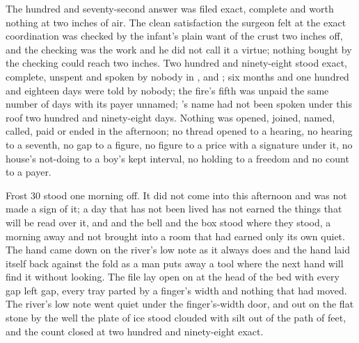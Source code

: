 The hundred and seventy-second answer was filed exact, complete and worth nothing at two inches of air. The clean satisfaction the surgeon felt at the exact coordination was checked by the infant's plain want of the crust two inches off, and the checking was the work and he did not call it a virtue; nothing bought by the checking could reach two inches. Two hundred and ninety-eight stood exact, complete, unspent and spoken by nobody in ,  and ; six months and one hundred and eighteen days were told by nobody; the fire's fifth was unpaid the same number of days with its payer unnamed; 's name had not been spoken under this roof two hundred and ninety-eight days. Nothing was opened, joined, named, called, paid or ended in the afternoon; no thread opened to a hearing, no hearing to a seventh, no gap to a figure, no figure to a price with a signature under it, no house's not-doing to a boy's kept interval, no holding to a freedom and no count to a payer.

Frost 30 stood one morning off. It did not come into this afternoon and was not made a sign of it; a day that has not been lived has not earned the things that will be read over it, and  and the bell and the box stood where they stood, a morning away and not brought into a room that had earned only its own quiet. The hand came down on the river's low note as it always does and the hand laid itself back against the fold as a man puts away a tool where the next hand will find it without looking. The file lay open on  at the head of the bed with every gap left gap, every tray parted by a finger's width and nothing that had moved. The river's low note went quiet under the finger's-width door, and out on the flat stone by the well the plate of ice stood clouded with silt out of the path of feet, and the count closed at two hundred and ninety-eight exact.
